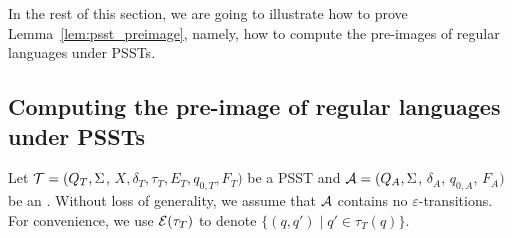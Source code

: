 %
%

In the rest of this section, we are going to illustrate how to prove Lemma~\ref{lem:psst_preimage}, namely, how to compute the pre-images of regular languages under PSSTs.

\subsection{Computing the pre-image of regular languages under PSSTs}\label{sec-pre-image}


 
Let $\mathcal{T} = (Q_T, \Sigma$, $X, \delta_T, \tau_T, E_T,  q_{0, T}, F_T)$ be a PSST  and $\mathcal{A}
  = (Q_A, \Sigma$, $\delta_A$, $q_{0, A}$, $F_A)$ be an \FA{}. Without loss of generality, we assume that $\mathcal{A}$ contains no $\varepsilon$-transitions. For convenience, we use $\mathcal{E}(\tau_T)$ to denote $\{(q, q') \mid q' \in \tau_T(q)\}$. 

